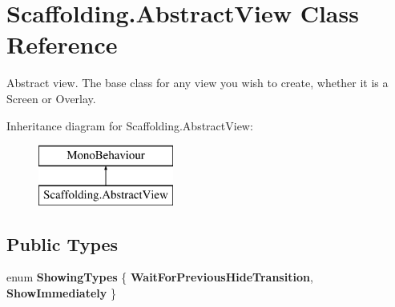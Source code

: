 \hypertarget{class_scaffolding_1_1_abstract_view}{\section{Scaffolding.\-Abstract\-View Class Reference}
\label{class_scaffolding_1_1_abstract_view}
}


Abstract view. The base class for any view you wish to create, whether it is a Screen or Overlay.  


Inheritance diagram for Scaffolding.\-Abstract\-View\-:\begin{figure}[H]
\begin{center}
\leavevmode
\includegraphics[height=2.000000cm]{class_scaffolding_1_1_abstract_view}
\end{center}
\end{figure}
\subsection*{Public Types}
\begin{DoxyCompactItemize}
\item 
enum {\bfseries Showing\-Types} \{ {\bfseries Wait\-For\-Previous\-Hide\-Transition}, 
{\bfseries Show\-Immediately}
 \}
\end{DoxyCompactItemize}
